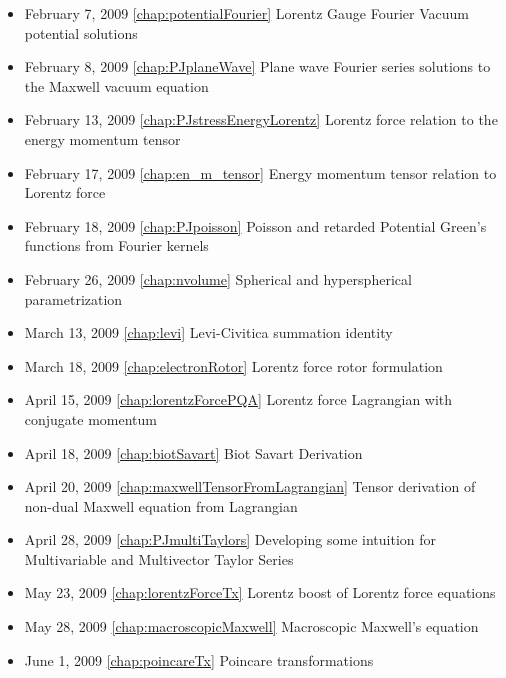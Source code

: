 \begin{itemize}
\item February 7, 2009 \ref{chap:potentialFourier} Lorentz Gauge Fourier Vacuum potential solutions

\item February 8, 2009 \ref{chap:PJplaneWave} Plane wave Fourier series solutions to the Maxwell vacuum equation

\item February 13, 2009 \ref{chap:PJstressEnergyLorentz} Lorentz force relation to the energy momentum tensor

\item February 17, 2009 \ref{chap:en_m_tensor} Energy momentum tensor relation to Lorentz force

\item February 18, 2009 \ref{chap:PJpoisson} Poisson and retarded Potential Green's functions from Fourier kernels

\item February 26, 2009 \ref{chap:nvolume} Spherical and hyperspherical parametrization

\item March 13, 2009 \ref{chap:levi} Levi-Civitica summation identity

\item March 18, 2009 \ref{chap:electronRotor} Lorentz force rotor formulation

\item April 15, 2009 \ref{chap:lorentzForcePQA} Lorentz force Lagrangian with conjugate momentum

\item April 18, 2009 \ref{chap:biotSavart} Biot Savart Derivation

\item April 20, 2009 \ref{chap:maxwellTensorFromLagrangian} Tensor derivation of non-dual Maxwell equation from Lagrangian

\item April 28, 2009 \ref{chap:PJmultiTaylors} Developing some intuition for Multivariable and Multivector Taylor Series

\item May 23, 2009 \ref{chap:lorentzForceTx} Lorentz boost of Lorentz force equations

\item May 28, 2009 \ref{chap:macroscopicMaxwell} Macroscopic Maxwell's equation

\item June 1, 2009 \ref{chap:poincareTx} Poincare transformations


\end{itemize}

